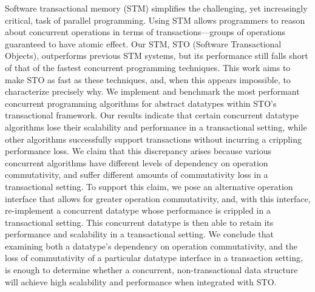 Software transactional memory (STM) simplifies the challenging, yet increasingly critical, task of parallel programming. Using STM allows programmers to reason about concurrent operations in terms of transactions---groups of operations guaranteed to have atomic effect. Our STM, STO (Software Transactional Objects), outperforms previous STM systems, but its performance still falls short of that of the fastest concurrent programming techniques. This work aims to make STO as fast as these techniques, and, when this appears impossible, to characterize precisely why. 
We implement and benchmark the most performant concurrent programming algorithms for abstract datatypes within STO's transactional framework. Our results indicate that certain concurrent datatype algorithms lose their scalability and performance in a transactional setting, while other algorithms successfully support transactions without incurring a crippling performance loss. We claim that this discrepancy arises because various concurrent algorithms have different levels of dependency on operation commutativity, and suffer different amounts of commutativity loss in a transactional setting. To support this claim, we pose an alternative operation interface that allows for greater operation commutativity, and, with this interface, re-implement a concurrent datatype whose performance is crippled in a transactional setting. This concurrent datatype is then able to retain its performance and scalability in a transactional setting.
We conclude that examining both a datatype's dependency on operation commutativity, and the loss of commutativity of a particular datatype interface in a transaction setting, is enough to determine whether a concurrent, non-transactional data structure will achieve high scalability and performance when integrated with STO.
